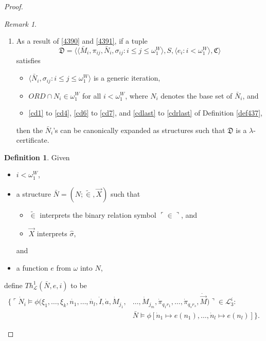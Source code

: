 \documentclass[12pt, twoside]{memoir}
\numberwithin{equation}{section}
\theoremstyle{definition}
\newtheorem{defi}[thm]{Definition}
\theoremstyle{remark}
\newtheorem{rem}[thm]{Remark}
\theoremstyle{definition}
\theoremstyle{definition}
\theoremstyle{definition}
\theoremstyle{remark}
\begin{document}
\begin{proof}
\begin{rem}
\begin{enumerate}[label=(\arabic*)]
    \item\label{4392} As a result of \ref{4390} and \ref{4391}, if a tuple
    \begin{equation*}
        \mathfrak{D} = \langle \langle \bar{M}_i, \pi_{ij},  \bar{N}_i, \sigma_{ij} : i \leq j \leq \omega_1^{W} \rangle, S, \langle e_i : i < \omega_1^W \rangle, \mathfrak{C} \rangle
    \end{equation*}
    satisfies 
    \begin{itemize}
        \item $\langle \bar{N}_i, \sigma_{ij} : i \leq  j \leq \omega_1^{W} \rangle$ is a generic iteration, 
        \item $ORD \cap N_i \in \omega_1^W$ for all $i < \omega_1^W$, where $N_i$ denotes the base set of $\bar{N}_i$, and
        \item \ref{cd1} to \ref{cd4}, \ref{cd6} to \ref{cd7}, and \ref{cdlast} to \ref{cdrlast} of Definition \ref{def437},
    \end{itemize}
    then the $\bar{N}_i$'s can be canonically expanded as structures such that $\mathfrak{D}$ is a $\lambda$-certificate.
\end{enumerate}

\end{rem}

\begin{defi}
Given
\begin{itemize}
    \item $i < \omega_1^W$,
    \item a structure $\bar{N} = (N; \tilde{\in}, \Vec{X})$ such that
    \begin{itemize}[label=$\circ$]
        \item $\tilde{\in}$ interprets the binary relation symbol $\ulcorner \in \urcorner$, and
        \item $\Vec{X}$ interprets $\hat{\sigma}$,
    \end{itemize}
    and
    \item a function $e$ from $\omega$ into $N$, 
\end{itemize} 
define $Th^{1}_{\mathcal{L}}(\bar{N}, e, i)$ to be 
\begin{align*}
    \{\ulcorner \dot{N}_i \models \phi(\xi_1, \ldots, \xi_k, \dot{n_1}, \ldots, \dot{n_l}, \dot{I}, \dot{a}, \dot{M}_{j_1}, & \ldots, \dot{M}_{j_m}, \dot{\pi}_{q_{1}r_{1}}, \ldots, \dot{\pi}_{q_{s}r_{s}}, \dot{\Vec{M}}) \urcorner \in \mathcal{L}^i_3 : \\ & \bar{N} \models \phi[\dot{n}_1 \mapsto e(n_1), \ldots, \dot{n}_l \mapsto e(n_l)]\}.
\end{align*}
\end{defi}


\end{proof}
\end{document}
